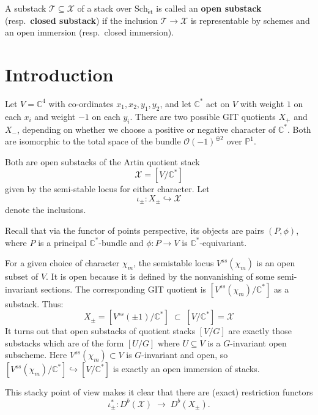 \documentclass[12pt]{article}
\begin{document}
\begin{definition}\label{def:open-closed-substacks}
A substack $\mathcal{T} \subseteq \mathcal{X}$ of a stack over $\mathrm{Sch}_{\mathrm{\acute{e}t}}$ 
is called an \textbf{open substack} (resp.\ \textbf{closed substack}) if the inclusion 
$\mathcal{T} \to \mathcal{X}$ is representable by schemes and an open immersion (resp.\ closed immersion).
\end{definition}

\section{Introduction}
Let $V = \mathbb{C}^4$ with co-ordinates $x_1, x_2, y_1, y_2$, and let $\mathbb{C}^*$ act on $V$ with weight $1$ on each $x_i$ and weight $-1$ on each $y_i$. There are two possible GIT quotients $X_{+}$ and $X_{-}$, depending on whether we choose a positive or negative character of $\mathbb{C}^*$. Both are isomorphic to the total space of the bundle $\mathcal{O}(-1)^{\oplus 2}$ over $\mathbb{P}^1$.

Both are open substacks of the Artin quotient stack
\[
    \mathcal{X} = [V/\mathbb{C}^*]
\]
given by the semi-stable locus for either character. 
Let
\[
    \iota_{\pm} : X_{\pm} \hookrightarrow \mathcal{X}
\]
denote the inclusions.

\begin{remark}
    Recall that via the functor of points perspective, its objects are pairs $(P,\phi)$, where $P$ is a principal $\mathbb{C}^*$-bundle and $\phi: P\to V$ is $\mathbb{C}^*$-equivariant.

    For a given choice of character $\chi_m$, the semistable locus $V^{ss}(\chi_m)$ is an open subset of $V$. It is open because it is defined by the nonvanishing of some semi-invariant sections. The corresponding GIT quotient is $[V^{ss}(\chi_m)/\mathbb{C}^*]$ as a substack.
Thus:
\[
X_\pm = [V^{ss}(\pm 1)/\mathbb{C}^*] \;\subset\; [V/\mathbb{C}^*] = \mathcal{X}
\]
It turns out that open substacks of quotient stacks $[V/G]$ are exactly those substacks which are of the form $[U/G]$ where $U\subseteq V$ is a $G$-invariant open subscheme. Here $V^{ss}(\chi_m)\subset V$ is $G$-invariant and open, so $[V^{ss}(\chi_m)/\mathbb{C}^*]\hookrightarrow [V/\mathbb{C}^*]$ is exactly an open immersion of stacks.
\end{remark}

This stacky point of view makes it clear that there are (exact) restriction functors
\[
    \iota_{\pm}^* : D^b(\mathcal{X}) \;\to\; D^b(X_{\pm}).
\]
\end{document}
